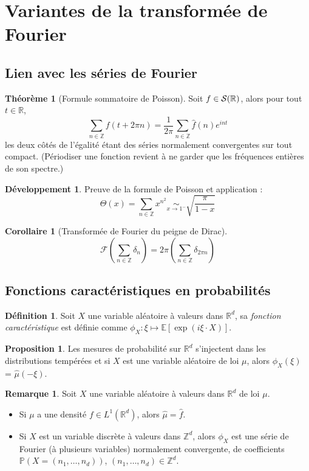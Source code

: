 \documentclass[11pt,a4paper,twocolumn]{article}
\theoremstyle{definition}
\newtheorem{definition}[equation]{Définition}
\newtheorem{proposition}[equation]{Proposition}
\newtheorem{theorem}[equation]{Théorème}
\newtheorem{remark}[equation]{Remarque}
\newtheorem{corollary}[equation]{Corollaire}
\newcounter{n}
\newtheorem{dev}[n]{Développement}
\def\F{\mathbb{F}}
\def\Z{\mathbb{Z}}
\def\R{\mathbb{R}}
\def\S{{\cal{S}}}
\def\F{\mathcal{F}}
\def\hf{\hat{f}}
\begin{document}
\section{Variantes de la transformée de Fourier}

\subsection{Lien avec les séries de Fourier}

\begin{theorem}[Formule sommatoire de Poisson]
  Soit $f \in \S(\R)$, alors pour tout $t \in \R$,
  \[ \sum_{n \in \Z} f(t + 2\pi n) = \frac{1}{2\pi} \sum_{n \in \Z}
    \hf(n)e^{int}\] les deux côtés de l'égalité étant des séries normalement
  convergentes sur tout compact. (Périodiser une fonction revient à ne garder
  que les fréquences entières de son spectre.)
\end{theorem}

\begin{dev}
  Preuve de la formule de Poisson et application :
  \[ \Theta(x) = \sum_{n \in \Z} x^{n^2} \underset{x \to 1^-}{\sim} \sqrt{\frac{\pi}{1-x}} \]
\end{dev}

\begin{corollary}[Transformée de Fourier du peigne de Dirac]
  \[ \F\left( \sum_{n \in \Z} \delta_n \right) = 2\pi \left( \sum_{n \in \Z}
      \delta_{2\pi n} \right) \]
\end{corollary}

\subsection{Fonctions caractéristiques en probabilités}

\begin{definition}
  Soit $X$ une variable aléatoire à valeurs dans $\R^d$, sa \emph{fonction
    caractéristique} est définie comme $\phi_X : \xi \mapsto
  \mathbb{E}[\exp(i\xi \cdot X)]$.
\end{definition}

\begin{proposition}
  Les mesures de probabilité sur $\R^d$ s'injectent dans les distributions
  tempérées et si $X$ est une variable aléatoire de loi $\mu$, alors
  $\phi_X(\xi)$ = $\hat{\mu}(-\xi)$.
\end{proposition}

\begin{remark} Soit $X$ une variable aléatoire à valeurs dans $\R^d$ de loi $\mu$.
  \begin{itemize}
  \item Si $\mu$ a une densité $f \in L^1(\R^d)$, alors $\hat{\mu} = \hf$.
  \item Si $X$ est un variable discrète à valeurs dans $\Z^d$, alors $\phi_X$
    est une série de Fourier (à plusieurs variables) normalement convergente, de
    coefficients $\mathbb{P}(X = (n_1, \ldots, n_d))$, $(n_1,\ldots,n_d) \in
      \Z^d$.
  \end{itemize}
\end{remark}
\end{document}
